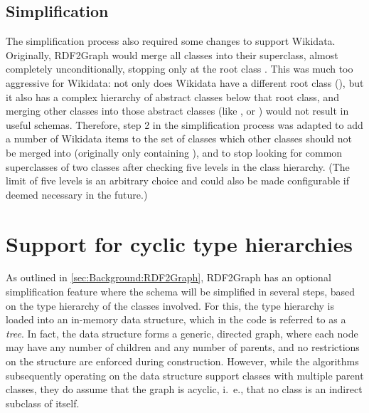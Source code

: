 \subsection{Simplification}
\label{subsec:RDF2Graph+Wikidata:Wikidata:simplification}

The simplification process also required some changes to support \gls{Wikidata}.
Originally, \gls{RDF2Graph} would merge all classes into their superclass,
almost completely unconditionally,
stopping only at the root class .
This was much too aggressive for \gls{Wikidata}:
not only does \gls{Wikidata} have a different root class (),
but it also has a complex hierarchy of abstract classes below that root class,
and merging other classes into those abstract classes
(like ,  or )
would not result in useful schemas.
Therefore, step 2 in the simplification process was adapted %
to add a number of \gls{Wikidata} \glspl{item} to the set of classes which other classes should not be merged into
(originally only containing ),
and to stop looking for common superclasses of two classes after checking five levels in the class hierarchy.
(The limit of five levels is an arbitrary choice
and could also be made configurable if deemed necessary in the future.) %

\section{Support for cyclic type hierarchies}
\label{sec:RDF2Graph+Wikidata:cyclic-graphs}

As outlined in \cref{sec:Background:RDF2Graph}, %
\gls{RDF2Graph} has an optional simplification feature
where the \gls{schema} will be simplified in several steps,
based on the type hierarchy of the classes involved.
For this, the type hierarchy is loaded into an in-memory data structure,
which in the code is referred to as a \emph{tree}. %
In fact, the data structure forms a generic, directed graph,
where each node may have any number of children and any number of parents,
and no restrictions on the structure are enforced during construction.
However, while the algorithms subsequently operating on the data structure support classes with multiple parent classes,
they do assume that the graph is acyclic,
i.~e., that no class is an indirect subclass of itself.

